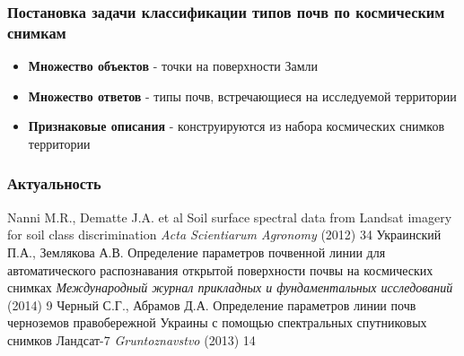 \documentclass{beamer}
\begin{document}
\begin{frame}
\frametitle{Постановка задачи классификации типов почв по космическим снимкам}
\begin{itemize}
\item \textbf{Множество объектов} - точки на поверхности Замли
\item \textbf{Множество ответов} - типы почв, встречающиеся на исследуемой территории
\item \textbf{Признаковые описания} - конструируются из набора космических снимков территории
\end{itemize}
\end{frame}

\begin{frame}
\frametitle{Актуальность}
\footnotesize{
\begin{thebibliography}{9}
\bibitem[]{} Nanni M.R., Dematte J.A. et al
\newblock Soil surface spectral data from Landsat imagery for soil class discrimination
\newblock \emph{Acta Scientiarum Agronomy} (2012) 34
\bibitem[]{} Украинский П.А., Землякова А.В.
\newblock Определение параметров почвенной линии
для автоматического распознавания открытой поверхности почвы на космических снимках
\newblock \emph{Международный журнал прикладных и фундаментальных исследований} (2014) 9
\bibitem[]{} Черный С.Г., Абрамов Д.А.
\newblock Определение параметров линии почв черноземов
правобережной Украины с помощью спектральных спутниковых снимков Ландсат-7
\newblock \emph{Gruntoznavstvo} (2013) 14
\end{thebibliography}}
\end{frame}

\end{document}
